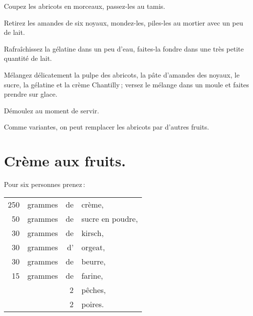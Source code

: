 Coupez les abricots en morceaux, passez-les au tamis.

Retirez les amandes de six noyaux, mondez-les, piles-les au mortier avec un
peu de lait.

Rafraîchissez la gélatine dans un peu d'eau, faites-la fondre dans une très petite
quantité de lait.

Mélangez délicatement la pulpe des abricots, la pâte d'amandes des noyaux, le
sucre, la gélatine et la crème Chantilly ; versez le mélange dans un moule et
faites prendre sur glace.

Démoulez au moment de servir.

\sk

Comme variantes, on peut remplacer les abricots par d'autres fruits.

\section*{\centering Crème aux fruits.}
{}

Pour six personnes prenez :

\footnotesize
\begin{longtable}{rrrp{16em}}
    250 & grammes & de & crème,                                                                           \\
     50 & grammes & de & sucre en poudre,                                                                 \\
     30 & grammes & de & kirsch,                                                                          \\
     30 & grammes & d' & orgeat,                                                                          \\
     30 & grammes & de & beurre,                                                                          \\
     15 & grammes & de & farine,                                                                          \\
        &         &  2 & pêches,                                                                          \\
        &         &  2 & poires.                                                                          \\
\end{longtable}
\normalsize

